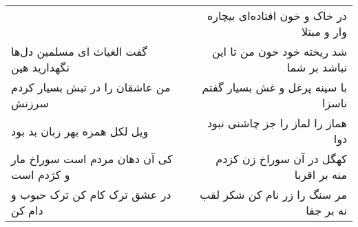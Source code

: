 \begin{center}
\begin{longtable}{l p{0.5cm} r}
&&
در خاک و خون افتاده‌ای بیچاره وار و مبتلا
\\
گفت الغیاث ای مسلمین دل‌ها نگهدارید هین
&&
شد ریخته خود خون من تا این نباشد بر شما
\\
من عاشقان را در تبش بسیار کردم سرزنش
&&
با سینه پرغل و غش بسیار گفتم ناسزا
\\
ویل لکل همزه بهر زبان بد بود
&&
هماز را لماز را جز چاشنی نبود دوا
\\
کی آن دهان مردم است سوراخ مار و کژدم است
&&
کهگل در آن سوراخ زن کزدم منه بر اقربا
\\
در عشق ترک کام کن ترک حبوب و دام کن
&&
مر سنگ را زر نام کن شکر لقب نه بر جفا
\\
\end{longtable}
\end{center}
